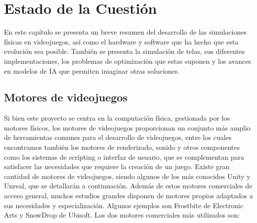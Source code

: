 \chapter{Estado de la Cuestión}
\label{cap:estadoDeLaCuestion}
En este capítulo se presenta un breve resumen del desarrollo de las simulaciones físicas en videojuegos, así como el hardware y software que ha hecho que esta evolución sea posible. También se presenta la simulación de telas, sus diferentes implementaciones, los problemas de optimización que estas suponen y los avances en modelos de IA que permiten imaginar otras soluciones.

\section{Motores de videojuegos}
Si bien este proyecto se centra en la computación física, gestionada por los motores físicos, los motores de videojuegos proporcionan un conjunto más amplio de herramientas comunes para el desarrollo de videojuegos, entre los cuales encontramos también los motores de renderizado, sonido y otros componentes como los sistemas de scripting o interfaz de usuario, que se complementan para satisfacer las necesidades que requiere la creación de un juego. Existe gran cantidad de motores de videojuegos, siendo algunos de los más conocidos Unity y Unreal, que se detallarán a continuación. Además de estos motores comerciales de acceso general, muchos estudios grandes disponen de motores propios adaptados a sus necesidades y especialización. Algunos ejemplos son Frostbite de Electronic Arts y SnowDrop de Ubisoft. Los dos motores comerciales más utilizados son: \newline

